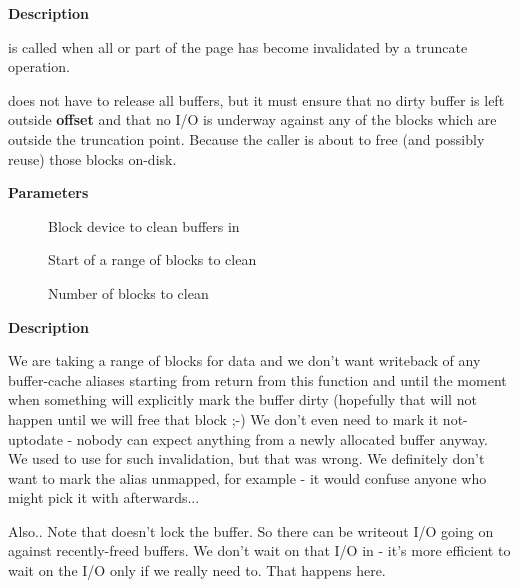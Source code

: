 \documentclass[a4paper,8pt,english]{sphinxmanual}
\begin{document}
\textbf{Description}

{\hyperref[filesystems/index:c.block_invalidatepage]{\emph{}}} is called when all or part of the page has become
invalidated by a truncate operation.

{\hyperref[filesystems/index:c.block_invalidatepage]{\emph{}}} does not have to release all buffers, but it must
ensure that no dirty buffer is left outside \textbf{offset} and that no I/O
is underway against any of the blocks which are outside the truncation
point.  Because the caller is about to free (and possibly reuse) those
blocks on-disk.

\begin{fulllineitems}
\label{filesystems/index:c.clean_bdev_aliases}
\end{fulllineitems}


\textbf{Parameters}
\begin{description}
\item[{}] \leavevmode
Block device to clean buffers in

\item[{}] \leavevmode
Start of a range of blocks to clean

\item[{}] \leavevmode
Number of blocks to clean

\end{description}

\textbf{Description}

We are taking a range of blocks for data and we don't want writeback of any
buffer-cache aliases starting from return from this function and until the
moment when something will explicitly mark the buffer dirty (hopefully that
will not happen until we will free that block ;-) We don't even need to mark
it not-uptodate - nobody can expect anything from a newly allocated buffer
anyway. We used to use  for such invalidation, but that was
wrong. We definitely don't want to mark the alias unmapped, for example - it
would confuse anyone who might pick it with  afterwards...

Also..  Note that  doesn't lock the buffer.  So there can be
writeout I/O going on against recently-freed buffers.  We don't wait on that
I/O in  - it's more efficient to wait on the I/O only if we really
need to.  That happens here.
\end{document}
